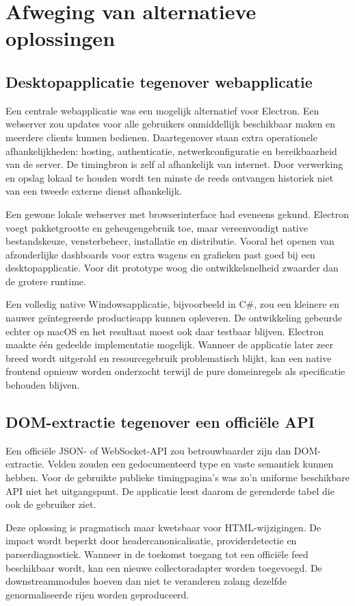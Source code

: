 \chapter{Afweging van alternatieve oplossingen}
\label{chap:alternatieven}

\section{Desktopapplicatie tegenover webapplicatie}
Een centrale webapplicatie was een mogelijk alternatief voor Electron. Een webserver zou updates voor alle gebruikers onmiddellijk beschikbaar maken en meerdere clients kunnen bedienen. Daartegenover staan extra operationele afhankelijkheden: hosting, authenticatie, netwerkconfiguratie en bereikbaarheid van de server. De timingbron is zelf al afhankelijk van internet. Door verwerking en opslag lokaal te houden wordt ten minste de reeds ontvangen historiek niet van een tweede externe dienst afhankelijk.

Een gewone lokale webserver met browserinterface had eveneens gekund. Electron voegt pakketgrootte en geheugengebruik toe, maar vereenvoudigt native bestandskeuze, vensterbeheer, installatie en distributie. Vooral het openen van afzonderlijke dashboards voor extra wagens en grafieken past goed bij een desktopapplicatie. Voor dit prototype woog die ontwikkelsnelheid zwaarder dan de grotere runtime.

Een volledig native Windowsapplicatie, bijvoorbeeld in C\#, zou een kleinere en nauwer geïntegreerde productieapp kunnen opleveren. De ontwikkeling gebeurde echter op macOS en het resultaat moest ook daar testbaar blijven. Electron maakte één gedeelde implementatie mogelijk. Wanneer de applicatie later zeer breed wordt uitgerold en resourcegebruik problematisch blijkt, kan een native frontend opnieuw worden onderzocht terwijl de pure domeinregels als specificatie behouden blijven.

\section{DOM-extractie tegenover een officiële API}
Een officiële JSON- of WebSocket-API zou betrouwbaarder zijn dan DOM-extractie. Velden zouden een gedocumenteerd type en vaste semantiek kunnen hebben. Voor de gebruikte publieke timingpagina's was zo'n uniforme beschikbare API niet het uitgangspunt. De applicatie leest daarom de gerenderde tabel die ook de gebruiker ziet.

Deze oplossing is pragmatisch maar kwetsbaar voor HTML-wijzigingen. De impact wordt beperkt door headercanonicalisatie, providerdetectie en parserdiagnostiek. Wanneer in de toekomst toegang tot een officiële feed beschikbaar wordt, kan een nieuwe collectoradapter worden toegevoegd. De downstreammodules hoeven dan niet te veranderen zolang dezelfde genormaliseerde rijen worden geproduceerd.

